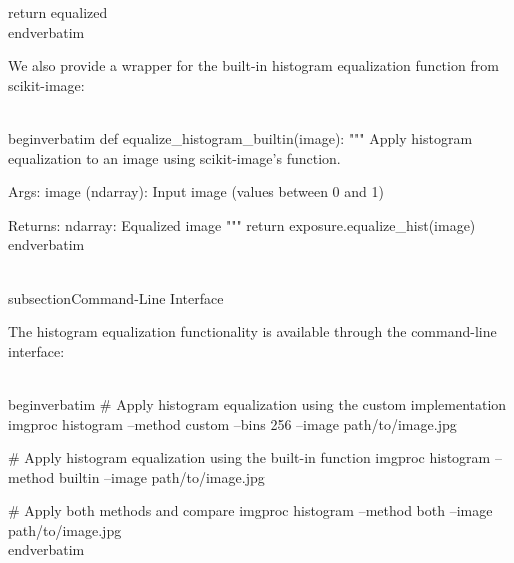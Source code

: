     return equalized
\\end{verbatim}

We also provide a wrapper for the built-in histogram equalization function from scikit-image:

\\begin{verbatim}
def equalize_histogram_builtin(image):
    """
    Apply histogram equalization to an image using scikit-image's function.
    
    Args:
        image (ndarray): Input image (values between 0 and 1)
        
    Returns:
        ndarray: Equalized image
    """
    return exposure.equalize_hist(image)
\\end{verbatim}

\\subsection{Command-Line Interface}

The histogram equalization functionality is available through the command-line interface:

\\begin{verbatim}
# Apply histogram equalization using the custom implementation
imgproc histogram --method custom --bins 256 --image path/to/image.jpg

# Apply histogram equalization using the built-in function
imgproc histogram --method builtin --image path/to/image.jpg

# Apply both methods and compare
imgproc histogram --method both --image path/to/image.jpg
\\end{verbatim}
